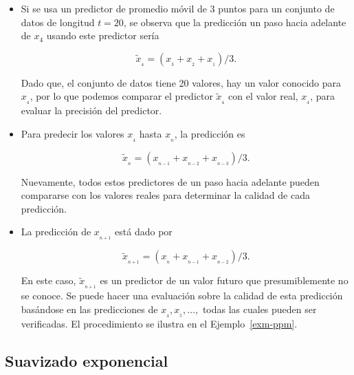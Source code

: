 \documentclass[
  us-letterpaper,
]{scrreprt}
\theoremstyle{plain}
\theoremstyle{definition}
\theoremstyle{definition}
\theoremstyle{plain}
\theoremstyle{remark}
\begin{document}
\begin{tcolorbox}[enhanced jigsaw, breakable, colbacktitle=quarto-callout-caution-color!10!white, rightrule=.15mm, toptitle=1mm, colback=white, left=2mm, colframe=quarto-callout-caution-color-frame, bottomtitle=1mm, opacitybacktitle=0.6, leftrule=.75mm, arc=.35mm, title={Ejemplos}, coltitle=black, titlerule=0mm, opacityback=0, bottomrule=.15mm, toprule=.15mm]

\begin{itemize}
\item
  Si se usa un predictor de promedio móvil de 3 puntos para un conjunto
  de datos de longitud \(t=20\), se observa que la predicción un paso
  hacia adelante de \(x_4\) usando este predictor sería

  \[
  \tilde{x}_{_4}=(x_{_3}+x_{_2}+x_{_1})/3.
  \]

  Dado que, el conjunto de datos tiene 20 valores, hay un valor conocido
  para \(x_{_4}\), por lo que podemos comparar el predictor
  \(\tilde{x}_{_4}\) con el valor real, \(x_{_4}\), para evaluar la
  precisión del predictor.
\item
  Para predecir los valores \(x_{_4}\) hasta \(x_{_n}\), la predicción
  es

  \[
  \tilde{x}_{_n}=(x_{_{n-1}}+x_{_{n-2}}+x_{_{n-3}})/3.
  \]

  Nuevamente, todos estos predictores de un paso hacia adelante pueden
  compararse con los valores reales para determinar la calidad de cada
  predicción.
\item
  La predicción de \(x_{_{n+1}}\) está dado por

  \[
  \tilde{x}_{_{n+1}}= (x_{_n}+x_{_{n-1}}+x_{_{n-2}})/3.
  \]

  En este caso, \(\tilde{x}_{_{n+1}}\) es un predictor de un valor
  futuro que presumiblemente no se conoce. Se puede hacer una evaluación
  sobre la calidad de esta predicción basándose en las predicciones de
  \(x_{_4},x_{_5},\ldots,\) todas las cuales pueden ser verificadas. El
  procedimiento se ilustra en el Ejemplo~\ref{exm-ppm}.
\end{itemize}

\end{tcolorbox}

\subsection{Suavizado exponencial}\label{suavizado-exponencial}
\end{document}
